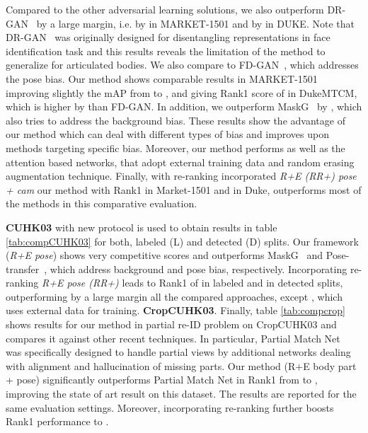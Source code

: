 \documentclass[10pt,twocolumn,letterpaper]{article}
\begin{document}
Compared  to the other adversarial learning solutions, we also outperform DR-GAN~\cite{zheng2017unlabeled} by a large margin, i.e. by  in MARKET-1501 and by  in DUKE. Note that DR-GAN~\cite{zheng2017unlabeled} was originally designed for disentangling representations in face identification task and this results reveals the limitation of the method to generalize for articulated bodies. We also compare to FD-GAN~\cite{ge2018fd}, which addresses the pose bias. Our method shows comparable results in MARKET-1501 improving slightly the mAP from  to , and giving  Rank1 score of  in DukeMTCM, which is higher by  than FD-GAN. 
In addition, we outperform MaskG~\cite{song2018mask} by , which  also tries to address the background bias. These results show the advantage of our method which can deal with different types of bias and improves upon methods targeting specific bias.
Moreover, our method  performs as well as the attention based networks, that adopt external training data and random erasing augmentation technique. 
Finally, with re-ranking incorporated \textit{R+E (RR+) pose + cam} our method with Rank1  in Market-1501 and  in Duke, outperforms most of the methods in this comparative evaluation.

\noindent\textbf{CUHK03} with new  protocol is used to obtain results in table \ref{tab:compCUHK03} for both, labeled (L) and detected (D) splits. Our framework (\textit{R+E pose}) shows very competitive scores and outperforms MaskG~\cite{song2018mask}  and Pose-transfer~\cite{liu2018pose}, which address background and pose bias, respectively. Incorporating re-ranking \textit{R+E pose (RR+)} leads to Rank1 of  in labeled and  in detected splits, outperforming by a large margin all the compared approaches, except , which uses external data for training. 
\newline
\noindent\textbf{CropCUHK03}. Finally, table \ref{tab:compcrop} shows results for our method in partial re-ID problem on CropCUHK03 and compares it against other recent techniques.  
In particular, Partial Match Net~\cite{iodice2018partial} was specifically designed to handle partial views by additional networks dealing with alignment and hallucination of missing parts.
Our method  (R+E body part + pose) significantly outperforms  Partial Match Net in Rank1  from  to , improving the state of art result on this dataset.  The results are reported for the same evaluation settings. Moreover, incorporating re-ranking further boosts Rank1 performance to  . \newline
\end{document}
